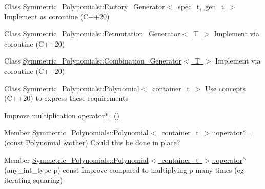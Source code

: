 
\begin{DoxyRefList}
\item[Class \mbox{\hyperlink{classSymmetric__Polynomials_1_1Factory__Generator}{Symmetric\+\_\+\+Polynomials\+::Factory\+\_\+\+Generator$<$ spec\+\_\+t, gen\+\_\+t $>$}} ]\label{todo__todo000001}%
%
Implement as coroutine (C++20)  
\item[Class \mbox{\hyperlink{classSymmetric__Polynomials_1_1Permutation__Generator}{Symmetric\+\_\+\+Polynomials\+::Permutation\+\_\+\+Generator$<$ T $>$}} ]\label{todo__todo000002}%
%
Implement via coroutine (C++20)  
\item[Class \mbox{\hyperlink{classSymmetric__Polynomials_1_1Combination__Generator}{Symmetric\+\_\+\+Polynomials\+::Combination\+\_\+\+Generator$<$ T $>$}} ]\label{todo__todo000003}%
%
Implement via coroutine (C++20)  
\item[Class \mbox{\hyperlink{classSymmetric__Polynomials_1_1Polynomial}{Symmetric\+\_\+\+Polynomials\+::Polynomial$<$ container\+\_\+t $>$}} ]\label{todo__todo000004}%
%
Use concepts (C++20) to express these requirements 

Improve multiplication {\ttfamily \mbox{\hyperlink{classSymmetric__Polynomials_1_1Polynomial_a84947ebd102746aed50c0f600b3409e8}{operator$\ast$=()}}}  
\item[Member \mbox{\hyperlink{classSymmetric__Polynomials_1_1Polynomial_a84947ebd102746aed50c0f600b3409e8}{Symmetric\+\_\+\+Polynomials\+::Polynomial$<$ container\+\_\+t $>$\+::operator$\ast$=}} (const \mbox{\hyperlink{classSymmetric__Polynomials_1_1Polynomial}{Polynomial}} \&other)]\label{todo__todo000005}%
%
Could this be done in place?  
\item[Member \mbox{\hyperlink{classSymmetric__Polynomials_1_1Polynomial_a85b255fec954a2fa5a261f7be522104f}{Symmetric\+\_\+\+Polynomials\+::Polynomial$<$ container\+\_\+t $>$\+::operator$^\wedge$}} (any\+\_\+int\+\_\+type p) const]\label{todo__todo000006}%
%
Improve compared to multiplying p many times (eg iterating squaring) 
\end{DoxyRefList}